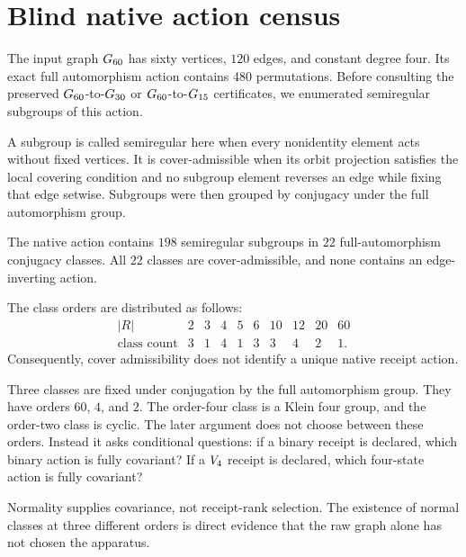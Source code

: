 \section{Blind native action census}

The input graph \(G_{60}\) has sixty vertices, \(120\) edges, and
constant degree four.  Its exact full automorphism action contains
\(480\) permutations.  Before consulting the preserved
\(G_{60}\)-to-\(G_{30}\) or \(G_{60}\)-to-\(G_{15}\)
certificates, we enumerated semiregular subgroups of this action.

A subgroup is called semiregular here when every nonidentity element
acts without fixed vertices.  It is cover-admissible when its orbit
projection satisfies the local covering condition and no subgroup
element reverses an edge while fixing that edge setwise.  Subgroups
were then grouped by conjugacy under the full automorphism group.

\begin{proposition}
The native action contains \(198\) semiregular subgroups in \(22\)
full-automorphism conjugacy classes.  All \(22\) classes are
cover-admissible, and none contains an edge-inverting action.
\end{proposition}

The class orders are distributed as follows:
\[
\begin{array}{c|ccccccccc}
\lvert R\rvert &2&3&4&5&6&10&12&20&60\\
\hline
\text{class count}&3&1&4&1&3&3&4&2&1.
\end{array}
\]
Consequently, cover admissibility does not identify a unique native
receipt action.

Three classes are fixed under conjugation by the full automorphism
group.  They have orders \(60\), \(4\), and \(2\).  The order-four
class is a Klein four group, and the order-two class is cyclic.  The
later argument does not choose between these orders.  Instead it asks
conditional questions: if a binary receipt is declared, which binary
action is fully covariant?  If a \(V_{4}\) receipt is declared, which
four-state action is fully covariant?

\begin{remark}
Normality supplies covariance, not receipt-rank selection.  The
existence of normal classes at three different orders is direct
evidence that the raw graph alone has not chosen the apparatus.
\end{remark}
